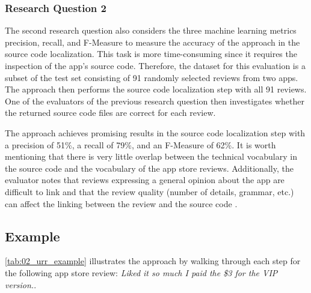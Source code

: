\subsubsection{Research Question 2}

The second research question also considers the three machine learning metrics precision, recall, and F-Measure to measure the accuracy of the approach in the source code localization. This task is more time-consuming since it requires the inspection of the app's source code. Therefore, the dataset for this evaluation is a subset of the test set consisting of 91 randomly selected reviews from two apps. The approach then performs the source code localization step with all 91 reviews. One of the evaluators of the previous research question then investigates whether the returned source code files are correct for each review.

The approach achieves promising results in the source code localization step with a precision of 51\%, a recall of 79\%, and an F-Measure of 62\%. It is worth mentioning that there is very little overlap between the technical vocabulary in the source code and the vocabulary of the app store reviews. Additionally, the evaluator notes that reviews expressing a general opinion about the app are difficult to link and that the review quality (number of details, grammar, etc.) can affect the linking between the review and the source code \cite[p. 99]{Ciurumelea.2017}.

\subsection{Example}

\autoref{tab:02_urr_example} illustrates the approach by walking through each step for the following app store review: \textit{Liked it so much I paid the \$3 for the VIP version.}.

